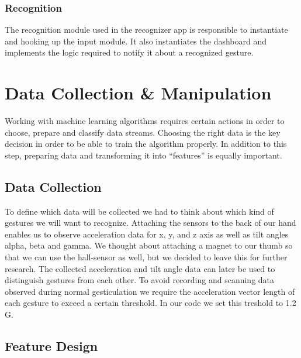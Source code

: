 \subsection{Recognition}
\label{ch:SystemDesign:sec:Components:sub:Recognition}

The recognition module used in the recognizer app is responsible to instantiate and hooking up the input module. It also instantiates the dashboard and implements the logic required to notify it about a recognized gesture.

\chapter{Data Collection \& Manipulation}
\label{ch:DataCollection}

Working  with  machine  learning  algorithms  requires  certain  actions  in  order  to choose, prepare and classify data streams.
Choosing the right data is the key decision in order to be able to train the  algorithm properly.
In addition to this  step, preparing data and transforming it into “features” is equally important. 

\section{Data Collection}
\label{ch:DataCollection:sec:DataCollection}

To  define  which  data  will  be  collected  we  had  to  think  about  which  kind  of gestures  we  will  want  to  recognize.
Attaching  the  sensors  to  the  back  of  our  hand enables us to observe acceleration data  for x,  y, and z axis  as well  as tilt  angles  alpha, beta and gamma.
We thought about attaching a magnet to our thumb so that we can use the hall-sensor as well,  but we decided to leave this  for  further research.
The collected acceleration and tilt angle data can later be used to distinguish gestures from each other.
To avoid recording and scanning data observed during normal gesticulation we require the acceleration vector length of each gesture to exceed a certain threshold.
In our code we set this treshold to 1.2 G.

\section{Feature Design}
\label{ch:DataCollection:sec:FeatureDesign}

